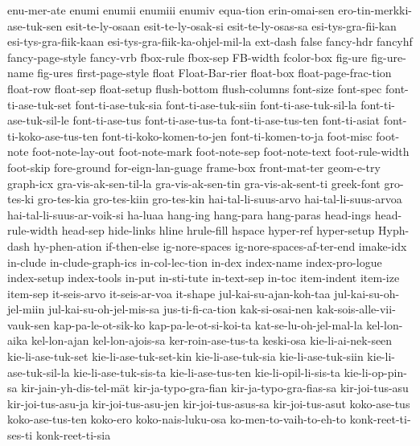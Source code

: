 {  enu-mer-ate
  enumi
  enumii
  enumiii
  enumiv
  equa-tion
  erin-omai-sen
  ero-tin-merkki-ase-tuk-sen
  esit-te-ly-osaan
  esit-te-ly-osak-si
  esit-te-ly-osas-sa
  esi-tys-gra-fii-kan
  esi-tys-gra-fiik-kaan
  esi-tys-gra-fiik-ka-ohjel-mil-la
  ext-dash
  false
  fancy-hdr
  fancyhf
  fancy-page-style
  fancy-vrb
  fbox-rule
  fbox-sep
  FB-width
  fcolor-box
  fig-ure
  fig-ure-name
  fig-ures
  first-page-style
  float
  Float-Bar-rier
  float-box
  float-page-frac-tion
  float-row
  float-sep
  float-setup
  flush-bottom
  flush-columns
  font-size
  font-spec
  font-ti-ase-tuk-set
  font-ti-ase-tuk-sia
  font-ti-ase-tuk-siin
  font-ti-ase-tuk-sil-la
  font-ti-ase-tuk-sil-le
  font-ti-ase-tus
  font-ti-ase-tus-ta
  font-ti-ase-tus-ten
  font-ti-asiat
  font-ti-koko-ase-tus-ten
  font-ti-koko-komen-to-jen
  font-ti-komen-to-ja
  foot-misc
  foot-note
  foot-note-lay-out
  foot-note-mark
  foot-note-sep
  foot-note-text
  foot-rule-width
  foot-skip
  fore-ground
  for-eign-lan-guage
  frame-box
  front-mat-ter
  geom-e-try
  graph-icx
  gra-vis-ak-sen-til-la
  gra-vis-ak-sen-tin
  gra-vis-ak-sent-ti
  greek-font
  gro-tes-ki
  gro-tes-kia
  gro-tes-kiin
  gro-tes-kin
  hai-tal-li-suus-arvo
  hai-tal-li-suus-arvoa
  hai-tal-li-suus-ar-voik-si
  ha-luaa
  hang-ing
  hang-para
  hang-paras
  head-ings
  head-rule-width
  head-sep
  hide-links
  hline
  hrule-fill
  hspace
  hyper-ref
  hyper-setup
  Hyph-dash
  hy-phen-ation
  if-then-else
  ig-nore-spaces
  ig-nore-spaces-af-ter-end
  imake-idx
  in-clude
  in-clude-graph-ics
  in-col-lec-tion
  in-dex
  index-name
  index-pro-logue
  index-setup
  index-tools
  in-put
  in-sti-tute
  in-text-sep
  in-toc
  item-indent
  item-ize
  item-sep
  it-seis-arvo
  it-seis-ar-voa
  it-shape
  jul-kai-su-ajan-koh-taa
  jul-kai-su-oh-jel-miin
  jul-kai-su-oh-jel-mis-sa
  jus-ti-fi-ca-tion
  kak-si-osai-nen
  kak-sois-alle-vii-vauk-sen
  kap-pa-le-ot-sik-ko
  kap-pa-le-ot-si-koi-ta
  kat-se-lu-oh-jel-mal-la
  kel-lon-aika
  kel-lon-ajan
  kel-lon-ajois-sa
  ker-roin-ase-tus-ta
  keski-osa
  kie-li-ai-nek-seen
  kie-li-ase-tuk-set
  kie-li-ase-tuk-set-kin
  kie-li-ase-tuk-sia
  kie-li-ase-tuk-siin
  kie-li-ase-tuk-sil-la
  kie-li-ase-tuk-sis-ta
  kie-li-ase-tus-ten
  kie-li-opil-li-sis-ta
  kie-li-op-pin-sa
  kir-jain-yh-dis-tel-mät
  kir-ja-typo-gra-fian
  kir-ja-typo-gra-fias-sa
  kir-joi-tus-asu
  kir-joi-tus-asu-ja
  kir-joi-tus-asu-jen
  kir-joi-tus-asus-sa
  kir-joi-tus-asut
  koko-ase-tus
  koko-ase-tus-ten
  koko-ero
  koko-nais-luku-osa
  ko-men-to-vaih-to-eh-to
  konk-reet-ti-ses-ti
  konk-reet-ti-sia
}

